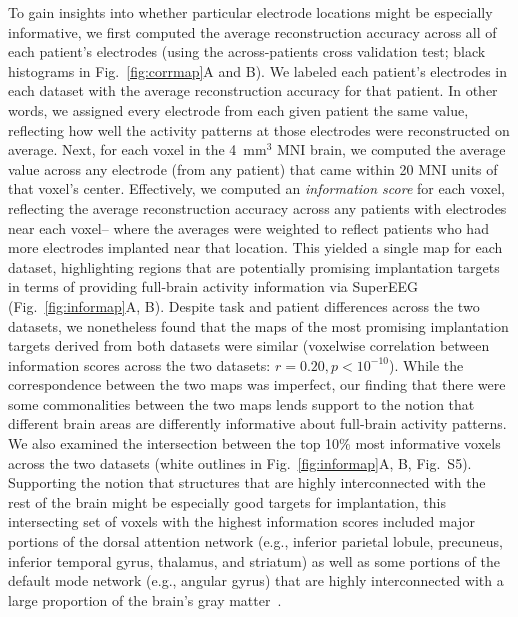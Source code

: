 \documentclass[11pt]{article}
\newcommand{\intersectmap}{S5}
\begin{document}
To gain insights into whether particular electrode locations might be
especially informative, we first computed the average reconstruction
accuracy across all of each patient's electrodes (using the
across-patients cross validation test; black histograms in
Fig.~\ref{fig:corrmap}A and B).  We labeled each patient's electrodes
in each dataset with the average reconstruction accuracy for that
patient.  In other words, we assigned every electrode from each given
patient the same value, reflecting how well the activity patterns at
those electrodes were reconstructed on average.  Next, for each voxel
in the 4~mm$^3$ MNI brain, we computed the average value across any
electrode (from any patient) that came within 20 MNI units of that
voxel's center.  Effectively, we computed an \textit{information
  score} for each voxel, reflecting the average reconstruction
accuracy across any patients with electrodes near each voxel-- where
the averages were weighted to reflect patients who had more electrodes
implanted near that location. This yielded a single map for each
dataset, highlighting regions that are potentially promising
implantation targets in terms of providing full-brain activity
information via SuperEEG (Fig.~\ref{fig:informap}A, B).  Despite task
and patient differences across the two datasets, we nonetheless found
that the maps of the most promising implantation targets derived from
both datasets were similar (voxelwise correlation between information
scores across the two datasets: $r = 0.20, p < 10^{-10}$).  While the
correspondence between the two maps was imperfect, our finding that
there were some commonalities between the two maps lends support to
the notion that different brain areas are differently informative
about full-brain activity patterns.  We also examined the intersection
between the top 10\% most informative voxels across the two datasets
(white outlines in Fig.~\ref{fig:informap}A, B, Fig.~\intersectmap).
Supporting the notion that structures that are highly interconnected
with the rest of the brain might be especially good targets for
implantation, this intersecting set of voxels with the highest
information scores included major portions of the dorsal attention
network (e.g., inferior parietal lobule, precuneus, inferior temporal
gyrus, thalamus, and striatum) as well as some portions of the default
mode network (e.g., angular gyrus) that are highly interconnected with
a large proportion of the brain's gray matter~\citep[e.g., ][]{TomaVolk11}.
\end{document}
